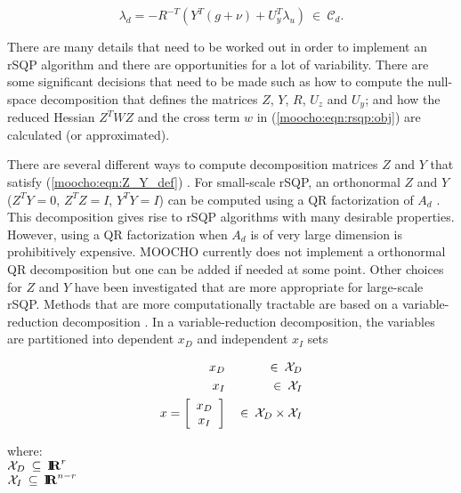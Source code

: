 \documentclass[pdf,ps2pdf,11pt]{SANDreport}
\begin{document}
{{{\bsinglespace
\begin{equation}
\lambda_d = - R^{-T} \left( Y^T(g + \nu) + U_y^T \lambda_u \right)
    \:\in\:\mathcal{C}_d.
\label{moocho:eqn:lambda_d}
\end{equation}
\esinglespace}

There are many details that need to be worked out in order to implement an
rSQP algorithm and there are opportunities for a lot of variability.  There
are some significant decisions that need to be made such as how to compute the
null-space decomposition that defines the matrices $Z$, $Y$, $R$, $U_z$ and
$U_y$; and how the reduced Hessian $Z^T W Z$ and the cross term $w$ in
(\ref{moocho:eqn:rsqp:obj}) are calculated (or approximated).

There are several different ways to compute decomposition matrices $Z$ and $Y$
that satisfy (\ref{moocho:eqn:Z_Y_def}) {}\cite{ref:schmid_accel_1993}.  For
small-scale rSQP, an orthonormal $Z$ and $Y$ ($Z^T Y = 0$, $Z^T Z = I$, $Y^T Y
= I$) can be computed using a QR factorization of $A_d$
{}\cite{ref:nocedal_overton_1985}.  This decomposition gives rise to rSQP
algorithms with many desirable properties.  However, using a QR factorization
when $A_d$ is of very large dimension is prohibitively expensive.  MOOCHO
currently does not implement a orthonormal QR decomposition but one can be
added if needed at some point.  Other choices for $Z$ and $Y$ have been
investigated that are more appropriate for large-scale rSQP.  Methods that are
more computationally tractable are based on a variable-reduction decomposition
{}\cite{ref:schmid_accel_1993}.  In a variable-reduction decomposition, the
variables are partitioned into dependent $x_D$ and independent $x_I$ sets

{\bsinglespace
\begin{eqnarray}
x_D & & \:\in\:\mathcal{X}_D \\
x_I & & \:\in\:\mathcal{X}_I \\
x = {\bmat{c} x_D \\ x_I \emat} & & \:\in\: \mathcal{X}_D \times \mathcal{X}_I
\label{rsqp:eqn:x_D_I} \\
\end{eqnarray}
\begin{tabbing}
\hspace{4ex}where:\hspace{5ex}\= \\
\>	$\mathcal{X}_D\:\subseteq\:\RE^{r}$\\
\>	$\mathcal{X}_I\:\subseteq\:\RE^{n-r}$
\end{tabbing}
\esinglespace}

}}
\end{document}
